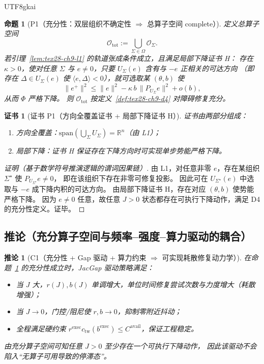 \documentclass[12pt]{article}
\newtheorem{proposition}{命题}[section]
\newtheorem{corollary}{推论}[section]
\newtheorem{Certificate}{证书}[section]
\newcommand{\RR}{\mathbb{R}}
\begin{document}
\begin{CJK*}{UTF8}{gkai}
\begin{proposition}[P1（充分性：双层组织不确定性 $\Rightarrow$ 总算子空间 complete）]
\label{prop:tex28-ch9-p1}
定义总算子空间
\[
  \mathcal{O}_{\mathrm{tot}}:=\bigcup_{\Sigma\in\Omega}\mathcal{O}_{\Sigma}.
\]
若引理~\ref{lem:tex28-ch9-l1} 的轨道张成条件成立，且满足局部下降证书 H：
存在 $\kappa>0$，使对任意 $\Sigma$ 与 $e\neq 0$，只要 $U_{\Sigma}(e)$ 含有与 $-e$ 正相关的可达方向
（即存在 $\Delta\in U_{\Sigma}(e)$ 使 $\langle e,\Delta\rangle<0$），就可选取某 $(\theta,b)$ 使
\[
  \|e^{+}\|^2
  \le
  \|e\|^2-\kappa\,b\,\|P_{U_{\Sigma}}e\|^2+o(b),
\]
从而 $\Phi$ 严格下降。
则 $\mathcal{O}_{\mathrm{tot}}$ 按定义~\ref{def:tex28-ch9-d4} 对障碍修复充分。
\end{proposition}

\begin{Certificate}[证书 P1（方向全覆盖证书 + 局部下降证书 H）]
\label{cert:tex28-ch9-p1}
证书由两部分组成：
\begin{enumerate}
  \item 方向全覆盖：$\mathrm{span}(\bigcup_{\Sigma}U_{\Sigma})=\RR^n$（由 L1）；
  \item 局部下降：证书 H 保证存在下降方向时可实现单步势能严格下降。
\end{enumerate}
\end{Certificate}

\begin{proof}[证明（基于数学符号推演逻辑的谓词因果链）]
由 L1，对任意非零 $e$，存在某组织 $\Sigma^{\star}$ 使 $P_{U_{\Sigma^{\star}}}e\neq 0$，
即在该组织下存在非零可修复投影。
因此可在 $U_{\Sigma^{\star}}(e)$ 中选取与 $-e$ 成下降内积的可达方向。
由局部下降证书 H，存在对应 $(\theta,b)$ 使势能严格下降。
因为 $e\neq 0$ 任意，故任意 $J>0$ 状态都存在可执行下降动作，满足 D4 的充分性定义。证毕。
\end{proof}

\subsection{推论（充分算子空间与频率--强度--算力驱动的耦合）}
\label{subsec:tex28-ch9-corollaries}

\begin{corollary}[C1（充分性 + Gap 驱动 + 算力约束 $\Rightarrow$ 可实现耗散修复动力学）]
\label{cor:tex28-ch9-c1}
在命题~\ref{prop:tex28-ch9-p1} 的充分性成立时，JacGap 驱动策略满足：
\begin{itemize}
  \item 当 $J$ 大，$r(J),b(J)$ 单调增大，单位时间修复尝试次数与力度增大（耗散增强）；
  \item 当 $J\to 0$，门控/阻尼使 $r,b\to 0$，抑制零附近抖动；
  \item 全程满足硬约束 $r^{\mathrm{exec}}c_{\mathrm{tw}}(b^{\mathrm{exec}})\le C^{\mathrm{avail}}$，保证工程稳定。
\end{itemize}
由充分算子空间可知任意 $J>0$ 至少存在一个可执行下降动作，
因此该驱动不会陷入“无算子可用导致的停滞态”。
\end{corollary}


\end{CJK*}
\end{document}
